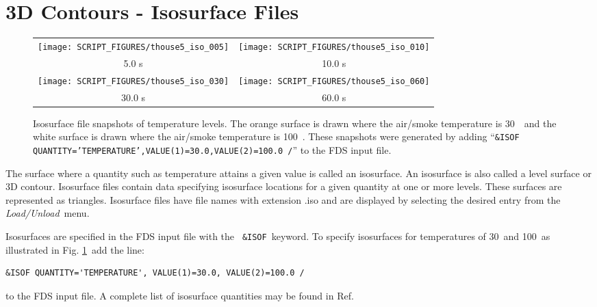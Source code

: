 \documentclass[11pt,twoside]{book}
\begin{document}
\section{3D Contours - Isosurface Files}
\label{section:isosurface}
\begin{figure}[bph]
\begin{center}
\begin{tabular}{cc}
\texttt{[image: SCRIPT\_FIGURES/thouse5\_iso\_005]}&
\texttt{[image: SCRIPT\_FIGURES/thouse5\_iso\_010]}\\
5.0 s&10.0 s\\
\texttt{[image: SCRIPT\_FIGURES/thouse5\_iso\_030]}&
\texttt{[image: SCRIPT\_FIGURES/thouse5\_iso\_060]}\\
30.0 s&60.0 s
\end{tabular}
\end{center}
\caption [Isosurface file snapshots of temperature levels. ]

{ Isosurface file snapshots of temperature levels. The orange
surface is drawn where the air/smoke temperature is 30~\degC\ and
the white surface is drawn where the air/smoke temperature is
100~\degC. These snapshots were generated by adding ``{\tt\&ISOF
QUANTITY='TEMPERATURE',VALUE(1)=30.0,VALUE(2)=100.0 /}'' to the
FDS input file.}
\label{figiso}%
\end{figure}

The surface where a quantity such as temperature attains a given
value is called an isosurface. An isosurface is also called a
level surface or 3D contour. Isosurface files contain data
specifying isosurface locations for a given quantity at one or
more levels. These surfaces are represented as triangles.
Isosurface files have file names with extension .iso and are
displayed by selecting the desired entry from the {\em
Load/Unload}\ menu.

Isosurfaces are specified in the FDS input file with the {\tt
\&ISOF}\ keyword.  To specify isosurfaces for temperatures of
30\degC\ and 100\degC\ as illustrated in Fig. \ref{figiso}\ add
the line:
\begin{lstlisting}
&ISOF QUANTITY='TEMPERATURE', VALUE(1)=30.0, VALUE(2)=100.0 /
\end{lstlisting}
to the FDS input file.  A complete list of isosurface quantities
may be found in Ref.~\cite{FDS_Users_Guide}
\end{document}
